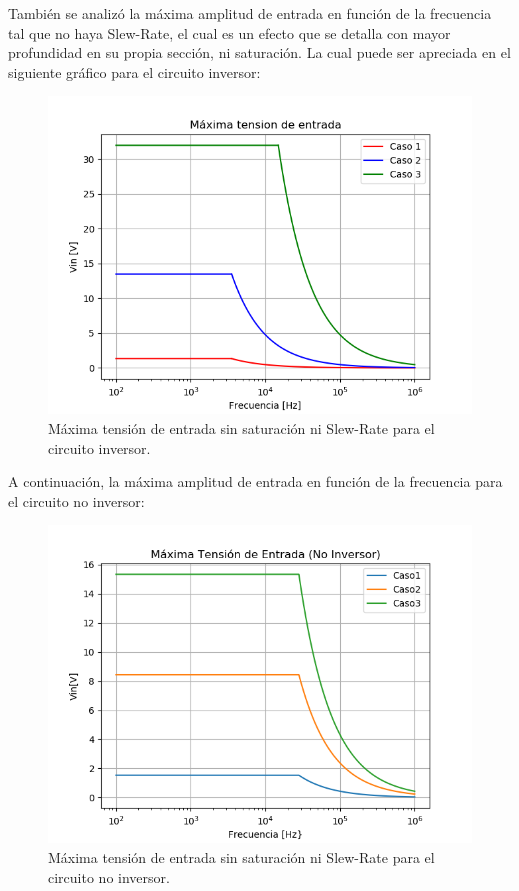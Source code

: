 También se analizó la máxima amplitud de entrada en función de la frecuencia tal que no haya Slew-Rate, el cual es un efecto que se detalla con mayor profundidad en su propia sección, ni saturación.
La cual puede ser apreciada en el siguiente gráfico para el circuito inversor:
\begin{figure}[H]	
	\centering
	\includegraphics[width=\textwidth]{Ejercicio1/Imagenes/maxvinsr.png}
	\caption{Máxima tensión de entrada sin saturación ni Slew-Rate para el circuito inversor.}
	\label{fig:MaxVinsr}
\end{figure} 
A continuación, la máxima amplitud de entrada en función de la frecuencia para el circuito no inversor:
\begin{figure}[H]	
	\centering
	\includegraphics[width=\textwidth]{Ejercicio1/Imagenes/maxvinsr_noinv.png}
	\caption{Máxima tensión de entrada sin saturación ni Slew-Rate para el circuito no inversor.}
	\label{fig:MaxVinsrnoinv}
\end{figure} 
